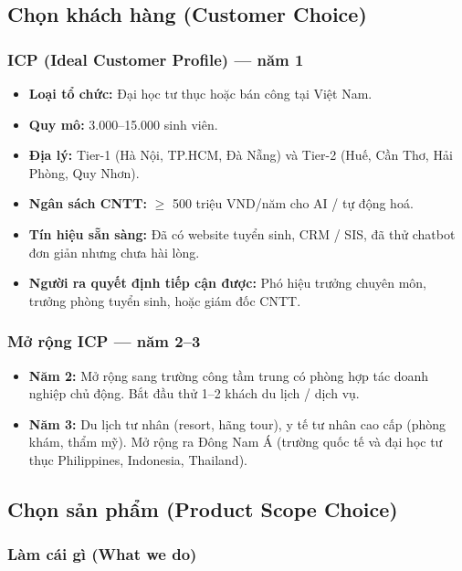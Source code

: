 \documentclass[11pt,a4paper]{article}
\begin{document}
\subsection{Chọn khách hàng (Customer Choice)}

\subsubsection*{ICP (Ideal Customer Profile) --- năm 1}

\begin{itemize}
\item \textbf{Loại tổ chức:} Đại học tư thục hoặc bán công tại Việt Nam.
\item \textbf{Quy mô:} 3.000--15.000 sinh viên.
\item \textbf{Địa lý:} Tier-1 (Hà Nội, TP.HCM, Đà Nẵng) và Tier-2 (Huế, Cần Thơ, Hải Phòng, Quy Nhơn).
\item \textbf{Ngân sách CNTT:} $\geq$ 500 triệu VND/năm cho AI / tự động hoá.
\item \textbf{Tín hiệu sẵn sàng:} Đã có website tuyển sinh, CRM / SIS, đã thử chatbot đơn giản nhưng chưa hài lòng.
\item \textbf{Người ra quyết định tiếp cận được:} Phó hiệu trưởng chuyên môn, trưởng phòng tuyển sinh, hoặc giám đốc CNTT.
\end{itemize}

\subsubsection*{Mở rộng ICP --- năm 2--3}

\begin{itemize}
\item \textbf{Năm 2:} Mở rộng sang trường công tầm trung có phòng hợp tác doanh nghiệp chủ động. Bắt đầu thử 1--2 khách du lịch / dịch vụ.
\item \textbf{Năm 3:} Du lịch tư nhân (resort, hãng tour), y tế tư nhân cao cấp (phòng khám, thẩm mỹ). Mở rộng ra Đông Nam Á (trường quốc tế và đại học tư thục Philippines, Indonesia, Thailand).
\end{itemize}

\subsection{Chọn sản phẩm (Product Scope Choice)}

\subsubsection*{Làm cái gì (What we do)}
\end{document}
